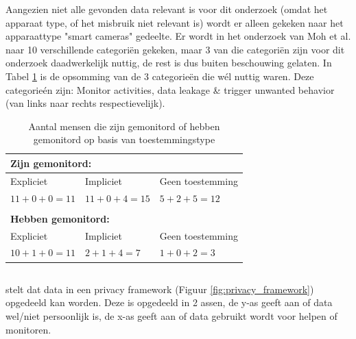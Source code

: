 \documentclass[nonacm,sigconf]{acmart}
\begin{document}
    Aangezien niet alle gevonden data relevant is voor dit onderzoek (omdat het apparaat type, of het misbruik niet relevant is) wordt er alleen gekeken naar het apparaattype "smart cameras" gedeelte.
    Er wordt in het onderzoek van Moh et al. naar 10 verschillende categoriën gekeken, maar 3 van die categoriën zijn voor dit onderzoek daadwerkelijk nuttig, de rest is dus buiten beschouwing gelaten.
    In Tabel \ref{table:moh} is de opsomming van de 3 categorieën die wél nuttig waren.
    Deze categorieén zijn: Monitor activities, data leakage & trigger unwanted behavior (van links naar rechts respectievelijk).

    \begin{table}[h]
        \centering
        \begin{tabular}{@{}lll@{}}
            \multicolumn{3}{l}{\textbf{Zijn gemonitord:}} \\ \hline
            \multicolumn{1}{|l|}{Expliciet}     & \multicolumn{1}{l|}{Impliciet}     & \multicolumn{1}{l|}{Geen toestemming} \\ \hline
            \multicolumn{1}{|l|}{$11+0+0 = 11$} & \multicolumn{1}{l|}{$11+0+4 = 15$} & \multicolumn{1}{l|}{$5+2+5 = 12$}     \\ \hline
            &                                    &                                       \\
            \multicolumn{3}{l}{\textbf{Hebben gemonitord:}} \\ \hline
            \multicolumn{1}{|l|}{Expliciet}     & \multicolumn{1}{l|}{Impliciet}     & \multicolumn{1}{l|}{Geen toestemming} \\ \hline
            \multicolumn{1}{|l|}{$10+1+0 = 11$} & \multicolumn{1}{l|}{$2+1+4 = 7$}   & \multicolumn{1}{l|}{$1+0+2 = 3$}      \\ \hline
        \end{tabular}
        \caption{Aantal mensen die zijn gemonitord of hebben gemonitord op basis van toestemmingstype \parencite{moh2023characterizing}}
        \label{table:moh}
    \end{table}



    \subsection{}
    \parencite{van2016privacy} stelt dat data in een privacy framework (Figuur \ref{fig:privacy_framework}) opgedeeld kan worden.
    Deze is opgedeeld in 2 assen, de y-as geeft aan of data wel/niet persoonlijk is, de x-as geeft aan of data gebruikt wordt voor helpen of monitoren.
\end{document}
